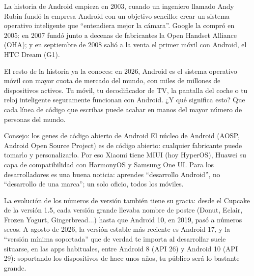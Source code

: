 


La historia de Android empieza en 2003, cuando un ingeniero llamado Andy Rubin fundó la empresa Android con un objetivo sencillo: crear un sistema operativo inteligente que “entendiera mejor la cámara”. Google la compró en 2005; en 2007 fundó junto a decenas de fabricantes la Open Handset Alliance (OHA); y en septiembre de 2008 salió a la venta el primer móvil con Android, el HTC Dream (G1).

El resto de la historia ya la conoces: en 2026, Android es el sistema operativo móvil con mayor cuota de mercado del mundo, con miles de millones de dispositivos activos. Tu móvil, tu decodificador de TV, la pantalla del coche o tu reloj inteligente seguramente funcionan con Android. ¿Y qué significa esto? Que cada línea de código que escribas puede acabar en manos del mayor número de personas del mundo.

\begin{tcbinfo}{Consejo: los genes de código abierto de Android}
El núcleo de Android (AOSP, Android Open Source Project) es de código abierto: cualquier fabricante puede tomarlo y personalizarlo. Por eso Xiaomi tiene MIUI (hoy HyperOS), Huawei su capa de compatibilidad con HarmonyOS y Samsung One UI. Para los desarrolladores es una buena noticia: aprendes “desarrollo Android”, no “desarrollo de una marca”; un solo oficio, todos los móviles.

\end{tcbinfo}

La evolución de los números de versión también tiene su gracia: desde el Cupcake de la versión 1.5, cada versión grande llevaba nombre de postre (Donut, Eclair, Frozen Yogurt, Gingerbread...) hasta que Android 10, en 2019, pasó a números secos. A agosto de 2026, la versión estable más reciente es Android 17, y la “versión mínima soportada” que de verdad te importa al desarrollar suele situarse, en las apps habituales, entre Android 8 (API 26) y Android 10 (API 29): soportando los dispositivos de hace unos años, tu público será lo bastante grande.

